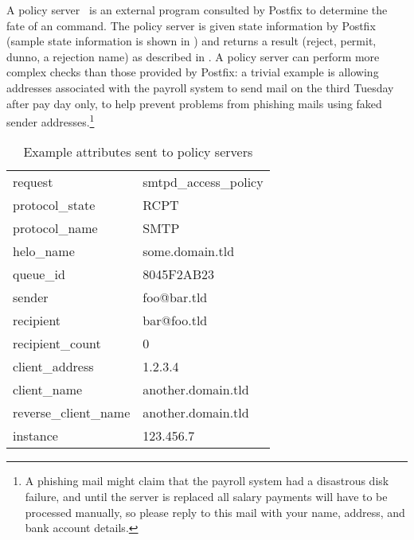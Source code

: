 A policy server~\cite{policy-servers} is an external program consulted by
Postfix to determine the fate of an  command.  The policy
server is given state information by Postfix (sample state information is
shown in ) and returns
a result (reject, permit, dunno, a rejection name) as described in
.  A policy server can
perform more complex checks than those provided by Postfix: a trivial
example is allowing addresses associated with the payroll system to send
mail on the third Tuesday after pay day only, to help prevent problems from
phishing mails using faked sender addresses.\footnote{A phishing mail might
claim that the payroll system had a disastrous disk failure, and until the
server is replaced all salary payments will have to be processed manually,
so please reply to this mail with your name, address, and bank account
details.}

\begin{table}[ht]

    \caption{Example attributes sent to policy servers}
    \empty{}\label{Example attributes sent to policy servers}

    \centering{}

    \begin{tabular}[]{ll}

        request                 & smtpd\_access\_policy     \\
        protocol\_state         & RCPT                      \\
        protocol\_name          & SMTP                      \\
        helo\_name              & some.domain.tld           \\
        queue\_id               & 8045F2AB23                \\
        sender                  & foo@bar.tld               \\
        recipient               & bar@foo.tld               \\
        recipient\_count        & 0                         \\
        client\_address         & 1.2.3.4                   \\
        client\_name            & another.domain.tld        \\
        reverse\_client\_name   & another.domain.tld        \\
        instance                & 123.456.7                 \\

    \end{tabular}

\end{table}

